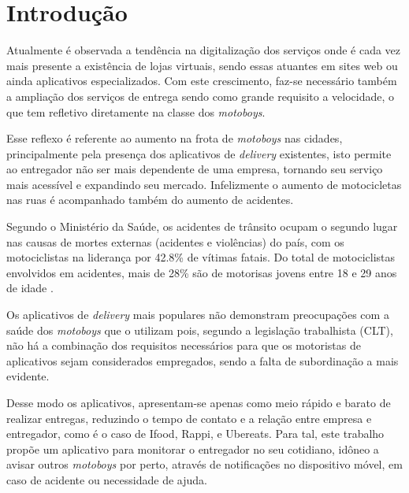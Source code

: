 





\chapter{     Introdução}\label{intro}

Atualmente é observada a tendência na digitalização dos serviços onde é cada vez mais presente a existência de lojas virtuais, sendo essas atuantes em sites web ou ainda aplicativos especializados. Com este crescimento, faz-se necessário também a ampliação dos serviços de entrega sendo como grande requisito a velocidade, o que tem refletivo diretamente na classe dos \textit{\textit{motoboys}}.


Esse reflexo é referente ao aumento na frota de \textit{\textit{motoboys}} nas cidades, principalmente pela presença dos aplicativos de \textit{delivery} existentes, isto permite ao entregador não ser mais dependente de uma empresa, tornando seu serviço mais acessível e expandindo seu mercado. Infelizmente o aumento de motocicletas nas ruas é acompanhado também do aumento de acidentes.


Segundo o Ministério da Saúde, os acidentes de trânsito ocupam o segundo lugar nas causas de mortes externas (acidentes e violências) do país, com os motociclistas na liderança por 42.8\% de vítimas fatais. Do total de motociclistas envolvidos em acidentes, mais de 28\% são de motorisas jovens entre 18 e 29 anos de idade \cite{giannini2019motoboys}.

Os aplicativos de \textit{delivery} mais populares não demonstram preocupações com a saúde dos \textit{motoboys} que o utilizam pois, segundo a legislação trabalhista (CLT), não há a combinação dos requisitos necessários para que os motoristas de aplicativos sejam considerados empregados, sendo a falta de subordinação a mais evidente.

Desse modo os aplicativos, apresentam-se apenas como meio rápido e barato de realizar entregas, reduzindo o tempo de contato e a relação entre  empresa e entregador, como é o caso de Ifood, Rappi, e Ubereats. Para tal, este trabalho propõe um aplicativo para monitorar o entregador no seu cotidiano, idôneo a avisar outros \textit{motoboys} por perto, através de notificações no dispositivo móvel, em caso de acidente ou necessidade de ajuda.




